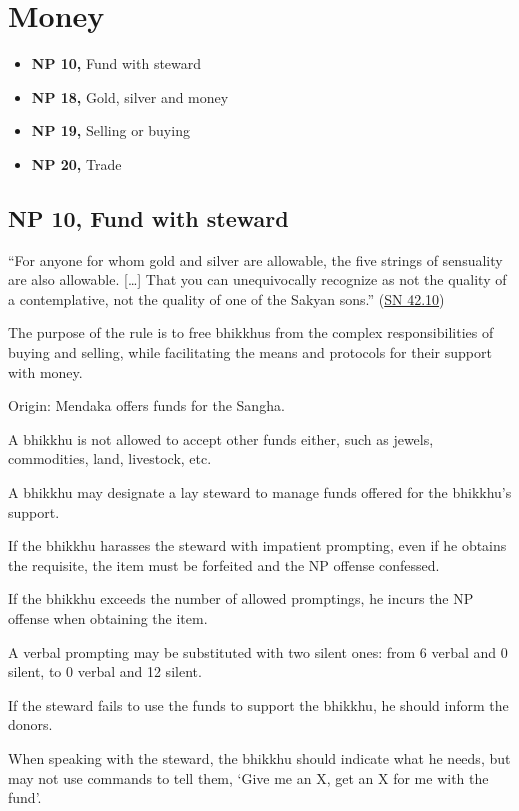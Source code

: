 \chapter{Money}

\begin{itemize}
\tightlist
\item
  \textbf{NP 10,} Fund with steward
\item
  \textbf{NP 18,} Gold, silver and money
\item
  \textbf{NP 19,} Selling or buying
\item
  \textbf{NP 20,} Trade
\end{itemize}

\section{NP 10, Fund with steward}

``For anyone for whom gold and silver are allowable, the five strings of
sensuality are also allowable. {[}\ldots{]} That you can unequivocally
recognize as not the quality of a contemplative, not the quality of one
of the Sakyan sons.''
(\href{https://www.dhammatalks.org/suttas/SN/SN42_10.html}{SN 42.10})

The purpose of the rule is to free bhikkhus from the complex
responsibilities of buying and selling, while facilitating the means and
protocols for their support with money.

Origin: Mendaka offers funds for the Sangha.

A bhikkhu is not allowed to accept other funds either, such as jewels,
commodities, land, livestock, etc.

A bhikkhu may designate a lay steward to manage funds offered for the
bhikkhu's support.

If the bhikkhu harasses the steward with impatient prompting, even if he
obtains the requisite, the item must be forfeited and the NP offense
confessed.

If the bhikkhu exceeds the number of allowed promptings, he incurs the
NP offense when obtaining the item.

A verbal prompting may be substituted with two silent ones: from 6
verbal and 0 silent, to 0 verbal and 12 silent.

If the steward fails to use the funds to support the bhikkhu, he should
inform the donors.

When speaking with the steward, the bhikkhu should indicate what he
needs, but may not use commands to tell them, `Give me an X, get an X
for me with the fund'.

